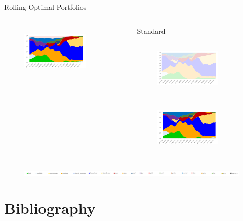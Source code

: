 \documentclass[c, 10pt]{beamer}
\newcommand\Fontvi{\fontsize{8}{7.2}\selectfont}
\begin{document}
\begin{frame}{Rolling Optimal Portfolios}
\begin{columns}
\begin{column}{0.3\textwidth}
\begin{figure}
            \end{figure}
            \begin{figure}
                \centering
                \includegraphics[width=3.2cm, height=2.6cm]{Images/rolling_allocation/rollstbtc.png}
            \end{figure}
		\end{column}
    	\begin{column}{0.3\textwidth} 
    	    \begin{center}
            \Fontvi{}Standard
            \end{center}
            \begin{figure}
                \centering
                \includegraphics[width=3.2cm, height=2.6cm]{Images/rolling_allocation/rollcrno.png}
            \end{figure}
            \begin{figure}
                \centering
                \includegraphics[width=3.2cm, height=2.6cm]{Images/rolling_allocation/rollstno.png}
            \end{figure}
		\end{column}
	\end{columns}
	\begin{figure}
	    \centering
	    \includegraphics[width=\linewidth]{Images/legend.PNG}
	\end{figure}
\end{frame}



	
\section{Bibliography}
\end{document}
